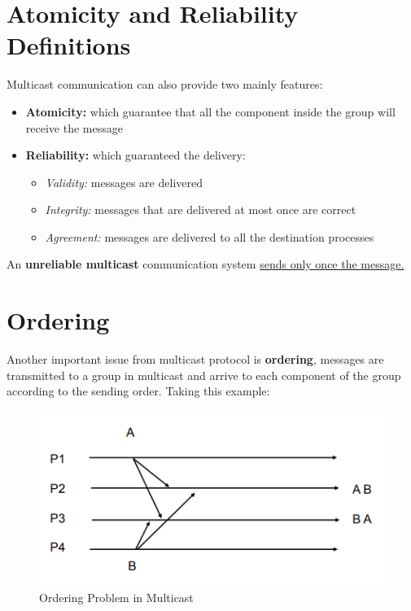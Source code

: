 \section{Atomicity and Reliability Definitions}
Multicast communication can also provide two mainly features:
\begin{itemize}
    \item \textbf{Atomicity:} which guarantee that all the component inside the group will receive the message
    \item \textbf{Reliability:} which guaranteed the delivery:
        \begin{itemize}
            \item \textit{Validity:} messages are delivered
            \item \textit{Integrity:} messages that are delivered at most once are correct
            \item \textit{Agreement:} messages are delivered to all the destination processes
        \end{itemize}
\end{itemize}
An \textbf{unreliable multicast} communication system \underline{sends only once the message.}

\section{Ordering}
Another important issue from multicast protocol is \textbf{ordering}, messages are transmitted to a group in multicast and arrive to each component of the group according to the sending order. Taking this example:

\begin{figure}[!h]
    \centering
    \includegraphics[width=.7\linewidth]{images/multicastCommunication/orderingProblemMulticast.PNG}
    \caption{Ordering Problem in Multicast}
\end{figure}

